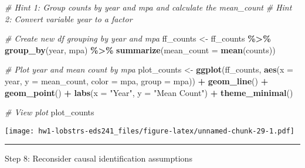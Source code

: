 \documentclass[
]{article}
\newenvironment{Shaded}{\begin{snugshade}}{\end{snugshade}}
\newcommand{\AttributeTok}[1]{\textcolor[rgb]{0.13,0.29,0.53}{#1}}
\newcommand{\CommentTok}[1]{\textcolor[rgb]{0.56,0.35,0.01}{\textit{#1}}}
\newcommand{\FunctionTok}[1]{\textcolor[rgb]{0.13,0.29,0.53}{\textbf{#1}}}
\newcommand{\NormalTok}[1]{#1}
\newcommand{\OtherTok}[1]{\textcolor[rgb]{0.56,0.35,0.01}{#1}}
\newcommand{\SpecialCharTok}[1]{\textcolor[rgb]{0.81,0.36,0.00}{\textbf{#1}}}
\newcommand{\StringTok}[1]{\textcolor[rgb]{0.31,0.60,0.02}{#1}}
\begin{document}
\begin{Shaded}
\begin{Highlighting}[]
\CommentTok{\# Hint 1: Group counts by \textasciigrave{}year\textasciigrave{} and \textasciigrave{}mpa\textasciigrave{} and calculate the \textasciigrave{}mean\_count\textasciigrave{}}
\CommentTok{\# Hint 2: Convert variable \textasciigrave{}year\textasciigrave{} to a factor}

\CommentTok{\# Create new df grouping by year and mpa }
\NormalTok{ff\_counts }\OtherTok{\textless{}{-}}\NormalTok{ ff\_counts }\SpecialCharTok{\%\textgreater{}\%} 
    \FunctionTok{group\_by}\NormalTok{(year, mpa) }\SpecialCharTok{\%\textgreater{}\%} 
    \FunctionTok{summarize}\NormalTok{(}\AttributeTok{mean\_count =} \FunctionTok{mean}\NormalTok{(counts))}

\CommentTok{\# Plot year and mean count by mpa}
\NormalTok{plot\_counts }\OtherTok{\textless{}{-}} \FunctionTok{ggplot}\NormalTok{(ff\_counts, }\FunctionTok{aes}\NormalTok{(}\AttributeTok{x =}\NormalTok{ year, }
                                     \AttributeTok{y =}\NormalTok{ mean\_count, }
                                     \AttributeTok{color =}\NormalTok{ mpa, }
                                     \AttributeTok{group =}\NormalTok{ mpa)) }\SpecialCharTok{+}
    \FunctionTok{geom\_line}\NormalTok{() }\SpecialCharTok{+}
    \FunctionTok{geom\_point}\NormalTok{() }\SpecialCharTok{+}
    \FunctionTok{labs}\NormalTok{(}\AttributeTok{x =} \StringTok{"Year"}\NormalTok{, }\AttributeTok{y =} \StringTok{"Mean Count"}\NormalTok{) }\SpecialCharTok{+}
    \FunctionTok{theme\_minimal}\NormalTok{()}

\CommentTok{\# View plot }
\NormalTok{plot\_counts }
\end{Highlighting}
\end{Shaded}

\texttt{[image: hw1-lobstrs-eds241\_files/figure-latex/unnamed-chunk-29-1.pdf]}

\begin{center}\rule{0.5\linewidth}{0.5pt}\end{center}

Step 8: Reconsider causal identification assumptions
\end{document}
